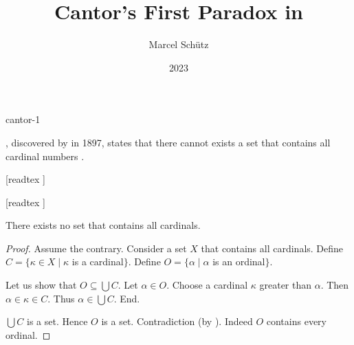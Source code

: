 \documentclass{stex}
\begin{document}
\title{Cantor's First Paradox in \Naproche}
\author{Marcel Schütz}
\date{2023}
\maketitle
\begin{smodule}{cantor-1}
\begin{sparagraph}
  \emph{}, discovered by  in 1897, states that there cannot exists a set that contains all cardinal numbers \cite[chapter 156]{Cantor1991}.
\end{sparagraph}

\begin{forthel}
  [readtex ]

  [readtex ]

  \begin{theorem*}\label{cantor_paradox_1}
    There exists no set that contains all cardinals.
  \end{theorem*}
  \begin{proof}
    Assume the contrary.
    Consider a set $X$ that contains all cardinals.
    Define $C = \{ \kappa \in X \mid \kappa$ is a cardinal$\}$.
    Define $O = \{ \alpha \mid \alpha$ is an ordinal$\}$.

    Let us show that $O \subseteq \bigcup C$.
      Let $\alpha \in O$.
      Choose a cardinal $\kappa$ greater than $\alpha$.
      Then $\alpha \in \kappa \in C$.
      Thus $\alpha \in \bigcup C$.
    End.

    $\bigcup C$ is a set.
    Hence $O$ is a set.
    Contradiction (by ).
    Indeed $O$ contains every ordinal.
  \end{proof}
\end{forthel}
\end{smodule}
\printbibliography
\end{document}
